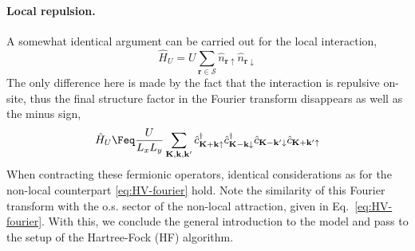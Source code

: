 \paragraph{Local repulsion.}\label{subsec:mft-discussion-reciprocal-local}

A somewhat identical argument can be carried out for the local interaction,
\[
	\hat H_U = U \sum_{\mathbf{r} \in \mathcal{S}} \hat n_{\mathbf{r}\uparrow} \hat n_{\mathbf{r}\downarrow}
\]
The only difference here is made by the fact that the interaction is repulsive on-site, thus the final structure factor in the Fourier transform disappears as well as the minus sign,
\begin{equation} \label{HU-Fourier}
	\hat H_U \Feq \frac{U}{L_x L_y}
	\sum_{\mathbf{K}, \mathbf{k}, \mathbf{k}'} \hat c_{\mathbf{K}+\mathbf{k} \uparrow}^\dagger \hat c_{\mathbf{K}-\mathbf{k} \downarrow}^\dagger \hat c_{\mathbf{K}-\mathbf{k}' \downarrow} \hat c_{\mathbf{K}+\mathbf{k}' \uparrow}
\end{equation}
When contracting these fermionic operators, identical considerations as for the non-local counterpart \eqref{eq:HV-fourier} hold. Note the similarity of this Fourier transform with the o.s. sector of the non-local attraction, given in Eq.~\eqref{eq:HV-fourier}. With this, we conclude the general introduction to the model and pass to the setup of the Hartree-Fock (HF) algorithm.

